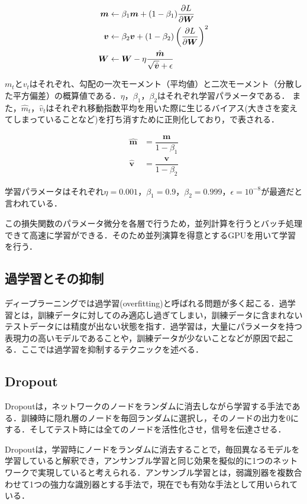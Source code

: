 \begin{align}\label{eq:adam}
	\bm{m} & \leftarrow \beta_1 \bm{m} + (1 - \beta_1) \dfrac{\partial L}{\partial \bm{W}} \\
	\bm{v} & \leftarrow \beta_2 \bm{v} + (1 - \beta_2) \left( \dfrac{\partial L}{\partial \bm{W}} \right) ^2 \\
	\bm{W} & \leftarrow \bm{W} - \eta \dfrac{\hat{\bm{m}}}{\sqrt{\hat{\bm{v}}} + \epsilon} 
\end{align}

$m_t$と$v_t$はそれぞれ、勾配の一次モーメント（平均値）と二次モーメント（分散した平方偏差）の概算値である．$\eta$，$\beta_1$，$\beta_2$はそれぞれ学習パラメータである．
また，$\hat{m}_t$，$\hat{v}_t$はそれぞれ移動指数平均を用いた際に生じるバイアス(大きさを変えてしまっていることなど)を打ち消すために正則化しており，で表される．

\begin{align}\label{eq:adamhat}
	\hat{\bm{m}} & = \dfrac{\bm{m}}{1 - \beta_1} \\
	\hat{\bm{v}} & = \dfrac{\bm{v}}{1 - \beta_2}
\end{align}

学習パラメータはそれぞれ$\eta = 0.001$，$\beta_1 = 0.9$，$\beta_2 = 0.999$，$\epsilon = 10^{-8}$が最適だと言われている\cite{Adam}．

この損失関数のパラメータ微分を各層で行うため，並列計算を行うとバッチ処理できて高速に学習ができる．そのため並列演算を得意とするGPUを用いて学習を行う．

\subsection{過学習とその抑制}
ディープラーニングでは過学習(overfitting)と呼ばれる問題が多く起こる．過学習とは，訓練データに対してのみ適応し過ぎてしまい，訓練データに含まれないテストデータには精度が出ない状態を指す．過学習は，大量にパラメータを持つ表現力の高いモデルであることや，訓練データが少ないことなどが原因で起こる．ここでは過学習を抑制するテクニックを述べる．

\subsection*{Dropout}
Dropout\cite{Dropout}は，ネットワークのノードをランダムに消去しながら学習する手法である．訓練時に隠れ層のノードを毎回ランダムに選択し，そのノードの出力を0にする．そしてテスト時には全てのノードを活性化させ，信号を伝達させる．

Dropoutは，学習時にノードをランダムに消去することで，毎回異なるモデルを学習していると解釈でき，アンサンブル学習と同じ効果を擬似的に1つのネットワークで実現していると考えられる．アンサンブル学習とは，弱識別器を複数合わせて1つの強力な識別器とする手法で，現在でも有効な手法として用いられている．

